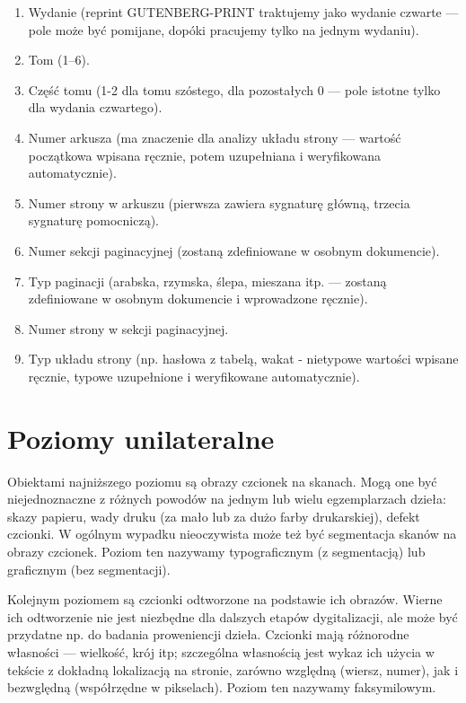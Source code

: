 \documentclass[12]{mwart}
\begin{document}
\begin{enumerate}
\item Wydanie (reprint GUTENBERG-PRINT traktujemy jako wydanie czwarte
  --- pole może być pomijane, dopóki pracujemy tylko na jednym
  wydaniu).
\item Tom (1--6).
\item Część tomu (1-2 dla tomu szóstego, dla pozostałych 0 --- pole
  istotne tylko dla wydania czwartego).
\item Numer arkusza (ma znaczenie dla analizy układu strony ---
  wartość początkowa wpisana ręcznie, potem uzupełniana i weryfikowana
  automatycznie).
\item Numer strony w arkuszu (pierwsza zawiera sygnaturę główną,
  trzecia sygnaturę pomocniczą).
\item Numer sekcji paginacyjnej (zostaną zdefiniowane w osobnym
  dokumencie).
\item Typ paginacji (arabska, rzymska, ślepa, mieszana itp. ---
  zostaną zdefiniowane w osobnym dokumencie i wprowadzone ręcznie).
\item Numer strony w sekcji paginacyjnej.
\item Typ układu strony (np. hasłowa z tabelą, wakat - nietypowe
  wartości wpisane ręcznie, typowe uzupełnione i weryfikowane
  automatycznie).
\end{enumerate}



\section{Poziomy unilateralne}
\label{sec:poziomy-unilateralne}


Obiektami najniższego poziomu są obrazy czcionek na skanach. Mogą one
być niejednoznaczne z różnych powodów na jednym lub wielu
egzemplarzach dzieła: skazy papieru, wady druku (za mało lub za dużo
farby drukarskiej), defekt czcionki. W ogólnym wypadku nieoczywista
może też być segmentacja skanów na obrazy czcionek. Poziom ten
nazywamy typograficznym (z segmentacją) lub graficznym (bez
segmentacji).

Kolejnym poziomem są czcionki odtworzone na podstawie ich
obrazów. Wierne ich odtworzenie nie jest niezbędne dla dalszych etapów
dygitalizacji, ale może być przydatne np. do badania proweniencji
dzieła. Czcionki mają różnorodne własności --- wielkość, krój itp;
szczególna własnością jest wykaz ich użycia w tekście z dokładną
lokalizacją na stronie, zarówno względną (wiersz, numer), jak i
bezwględną (współrzędne w pikselach). Poziom ten nazywamy
faksymilowym.
\end{document}
